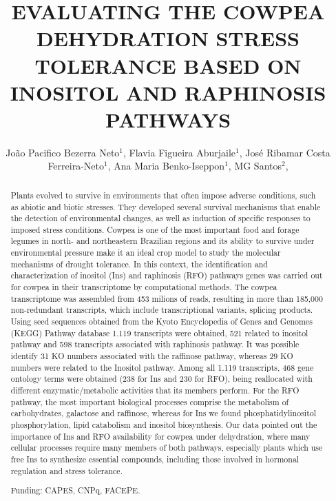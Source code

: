 \documentclass[twoside]{article}
\title{\vspace{-15mm}\fontsize{24pt}{10pt}\selectfont\textbf{ EVALUATING THE COWPEA DEHYDRATION STRESS TOLERANCE BASED ON INOSITOL AND RAPHINOSIS PATHWAYS }} %
\author{ João Pacifico Bezerra Neto$^{1}$, Flavia Figueira Aburjaile$^{1}$, José Ribamar Costa Ferreira-Neto$^{1}$, Ana Maria Benko-Iseppon$^{1}$, MG Santos$^{2}$, }
\affil{ 1 Federal University of Pernambuco, Center of Biological Sciences, Genetics Dept

2 Federal University of Pernambuco, Botany Dept, Plant Physiology Laboratory

 }
\date{}
\begin{document}
  
  
  \maketitle %
  
  
  \thispagestyle{fancy} %
  
  
  \begin{abstract}
  Plants evolved to survive in environments that often impose adverse conditions, such as abiotic and biotic stresses. They developed several survival mechanisms that enable the detection of environmental changes, as well as induction of specific responses to imposed stress conditions. Cowpea is one of the most important food and forage legumes in north- and northeastern Brazilian regions and its ability to survive under environmental pressure make it an ideal crop model to study the molecular mechanisms of drought tolerance. In this context, the identification and characterization of inositol (Ins) and raphinosis (RFO) pathways genes was carried out for cowpea in their transcriptome by computational methods. The cowpea transcriptome was assembled from 453 milions of reads, resulting in more than 185,000 non-redundant transcripts, which include transcriptional variants, splicing products. Using seed sequences obtained from the Kyoto Encyclopedia of Genes and Genomes (KEGG) Pathway database 1.119 transcripts were obtained, 521 related to inositol pathway and 598 transcripts associated with raphinosis pathway. It was possible identify 31 KO numbers associated with the raffinose pathway, whereas 29 KO numbers were related to the Inositol pathway. Among all 1.119 transcripts, 468 gene ontology terms were obtained (238 for Ins and 230 for RFO), being reallocated with different enzymatic/metabolic activities that its members perform. For the RFO pathway, the most important biological processes comprise the metabolism of carbohydrates, galactose and raffinose, whereas for Ins we found phosphatidylinositol phosphorylation, lipid catabolism and inositol biosynthesis. Our data pointed out the importance of Ins and RFO availability for cowpea under dehydration, where many cellular processes require many members of both pathways, especially plants which use free Ins to synthesize essential compounds, including those involved in hormonal regulation and stress tolerance.
  
  Funding: CAPES, CNPq, FACEPE. \\ 
  \end{abstract}
  
\end{document}
